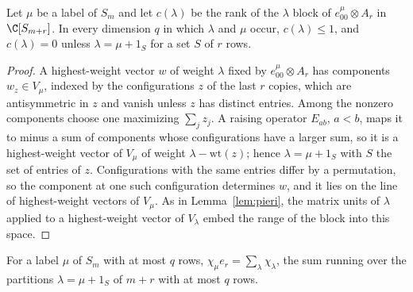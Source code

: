 \begin{lemma}
    \label{lem:exterior_highest_weight}
    \leanok
    Let $\mu$ be a label of $S_m$ and let $c(\lambda)$ be the rank of the $\lambda$ block
    of $e^\mu_{00}\otimes A_r$ in $\C[S_{m+r}]$. In every dimension $q$ in which $\lambda$
    and $\mu$ occur, $c(\lambda)\le1$, and $c(\lambda)=0$ unless $\lambda=\mu+1_S$ for a
    set $S$ of $r$ rows.
\end{lemma}

\begin{proof}\leanok
    A highest-weight vector $w$ of weight $\lambda$ fixed by $e^\mu_{00}\otimes A_r$ has
    components $w_z\in V_\mu$, indexed by the configurations $z$ of the last $r$ copies,
    which are antisymmetric in $z$ and vanish unless $z$ has distinct entries. Among the
    nonzero components choose one maximizing $\sum_jz_j$. A raising operator
    $E_{ab}$, $a<b$, maps it to minus a sum of components whose configurations have a
    larger sum, so it is a highest-weight vector of $V_\mu$ of weight $\lambda-\mathrm{wt}(z)$;
    hence $\lambda=\mu+1_S$ with $S$ the set of entries of $z$. Configurations with the same
    entries differ by a permutation, so the component at one such configuration determines
    $w$, and it lies on the line of highest-weight vectors of $V_\mu$. As in
    Lemma~\ref{lem:pieri}, the matrix units of $\lambda$ applied to a highest-weight vector
    of $V_\lambda$ embed the range of the block into this space.
\end{proof}

\begin{theorem}
    \label{thm:character_pieri}
    \leanok
    For a label $\mu$ of $S_m$ with at most $q$ rows,
    $\chi_\mu e_r=\sum_\lambda\chi_\lambda$, the sum running over the partitions
    $\lambda=\mu+1_S$ of $m+r$ with at most $q$ rows.
\end{theorem}

